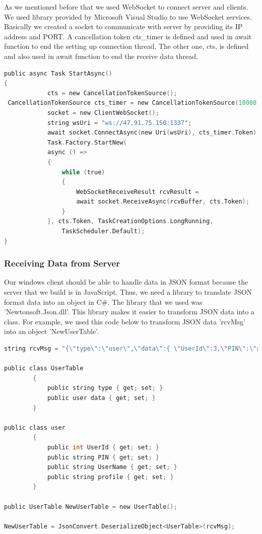 \documentclass[a4paper,11pt]{article}
\begin{document}
As we mentioned before that we used WebSocket to connect server and clients. We used library provided by Microsoft Visual Studio to use WebSocket services. Basically we created a socket to communicate with server by providing its IP address and PORT. A cancellation token cts\_timer is defined and used in await function to end the setting up connection thread. The other one, cts, is defined and also used in await function to end the receive data thread.
\begin{lstlisting}[language=C]
public async Task StartAsync()
{
            cts = new CancellationTokenSource();
 CancellationTokenSource cts_timer = new CancellationTokenSource(10000);
            socket = new ClientWebSocket();
            string wsUri = "ws://47.91.75.150:1337";
            await socket.ConnectAsync(new Uri(wsUri), cts_timer.Token);
            Task.Factory.StartNew(
            async () =>
            {
                while (true)
                {
                    WebSocketReceiveResult rcvResult =
                    await socket.ReceiveAsync(rcvBuffer, cts.Token);
                }
            }, cts.Token, TaskCreationOptions.LongRunning,
                TaskScheduler.Default);
}
\end{lstlisting}
\subsubsection{Receiving Data from Server}

	Our windows client should be able to handle data in JSON format because the server that we build is in JavaScript. Thus, we need a library to translate JSON format data into an object in C\#. The library that we used was 'Newtonsoft.Json.dll'. This library makes it easier to transform JSON data into a class. For example, we used this code below to transform JSON data 'rcvMsg' into an object 'NewUserTable'.

\begin{lstlisting}[language=C]
string rcvMsg = "{\"type\":\"user\",\"data\":{ \"UserId\":3,\"PIN\":\"admin\",\"UserName\":\"peggy\",\"profile\":\"assets / dist / images / 5.jpg\"}}";

public class UserTable
        {
            public string type { get; set; }
            public user data { get; set; }
        }

public class user
        {
            public int UserId { get; set; }
            public string PIN { get; set; }
            public string UserName { get; set; }
            public string profile { get; set; }
        }
        
public UserTable NewUserTable = new UserTable();

NewUserTable = JsonConvert.DeserializeObject<UserTable>(rcvMsg);
\end{lstlisting}
\end{document}
